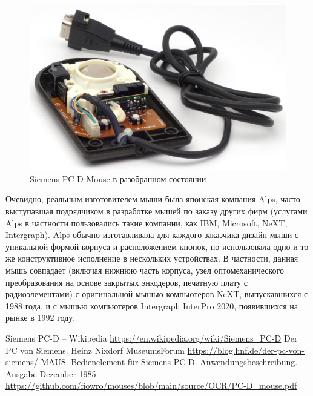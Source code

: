 \documentclass[11pt, a4paper]{article}
\begin{document}
\begin{figure}[h]
    \centering
    \includegraphics[scale=0.8]{1985_siemens_pcd_mouse/inside_30.jpg} 
    \caption{Siemens PC-D Mouse в разобранном состоянии}
    \label{fig:SiemensPCDInside}
\end{figure}

Очевидно, реальным изготовителем мыши была японская компания Alps, часто выступавшая подрядчиком в разработке мышей по заказу других фирм (услугами Alps в частности пользовались такие компании, как IBM, Microsoft, NeXT, Intergraph). Alps обычно изготавливала для каждого заказчика дизайн мыши с уникальной формой корпуса и расположением кнопок, но использовала одно и то же конструктивное исполнение в нескольких устройствах. В частности, данная мышь совпадает (включая нижнюю часть корпуса, узел оптомеханического преобразования на основе закрытых энкодеров, печатную плату с радиоэлементами) с оригинальной мышью компьютеров NeXT, выпускавшихся с 1988 года, и с мышью компьютеров Intergraph InterPro 2020, появившихся на рынке в 1992 году.

\begin{thebibliography}{9}
 Siemens PC-D -- Wikipedia \url{https://en.wikipedia.org/wiki/Siemens_PC-D}
 Der PC von Siemens. Heinz Nixdorf MuseumsForum \url{https://blog.hnf.de/der-pc-von-siemens/}
 MAUS. Bedienelement für Siemens PC-D. Anwendungsbeschreibung. Ausgabe Dezember 1985. \url{https://github.com/fiowro/mouses/blob/main/source/OCR/PC-D_mouse.pdf}
\end{thebibliography}
\end{document}
